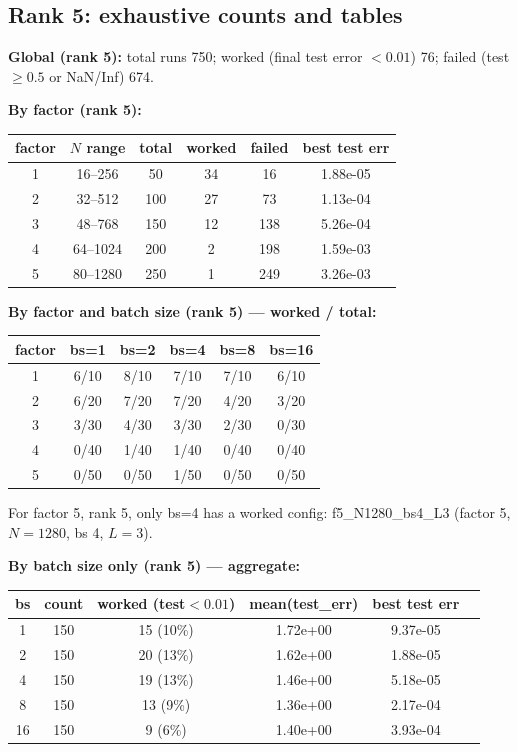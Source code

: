 \documentclass{article}
\theoremstyle{plain}
\theoremstyle{definition}
\begin{document}
\subsection{Rank 5: exhaustive counts and tables}

\textbf{Global (rank 5):} total runs 750; worked (final test error $< 0.01$) 76; failed (test $\ge 0.5$ or NaN/Inf) 674.

\textbf{By factor (rank 5):}
\begin{center}
\small
\begin{tabular}{@{}cccccc@{}}
\toprule
factor & $N$ range & total & worked & failed & best test err \\
\midrule
1 & 16--256 & 50 & 34 & 16 & 1.88e-05 \\
2 & 32--512 & 100 & 27 & 73 & 1.13e-04 \\
3 & 48--768 & 150 & 12 & 138 & 5.26e-04 \\
4 & 64--1024 & 200 & 2 & 198 & 1.59e-03 \\
5 & 80--1280 & 250 & 1 & 249 & 3.26e-03 \\
\bottomrule
\end{tabular}
\end{center}

\textbf{By factor and batch size (rank 5) --- worked / total:}
\begin{center}
\small
\begin{tabular}{@{}cccccc@{}}
\toprule
factor & bs=1 & bs=2 & bs=4 & bs=8 & bs=16 \\
\midrule
1 & 6/10 & 8/10 & 7/10 & 7/10 & 6/10 \\
2 & 6/20 & 7/20 & 7/20 & 4/20 & 3/20 \\
3 & 3/30 & 4/30 & 3/30 & 2/30 & 0/30 \\
4 & 0/40 & 1/40 & 1/40 & 0/40 & 0/40 \\
5 & 0/50 & 0/50 & 1/50 & 0/50 & 0/50 \\
\bottomrule
\end{tabular}
\end{center}
For factor 5, rank 5, only bs=4 has a worked config: f5\_N1280\_bs4\_L3 (factor 5, $N=1280$, bs 4, $L=3$).

\textbf{By batch size only (rank 5) --- aggregate:}
\begin{center}
\small
\begin{tabular}{@{}cccccc@{}}
\toprule
bs & count & worked (test$<0.01$) & mean(test\_err) & best test err \\
\midrule
1 & 150 & 15 (10\%) & 1.72e+00 & 9.37e-05 \\
2 & 150 & 20 (13\%) & 1.62e+00 & 1.88e-05 \\
4 & 150 & 19 (13\%) & 1.46e+00 & 5.18e-05 \\
8 & 150 & 13 (9\%) & 1.36e+00 & 2.17e-04 \\
16 & 150 & 9 (6\%) & 1.40e+00 & 3.93e-04 \\
\bottomrule
\end{tabular}
\end{center}
\end{document}
